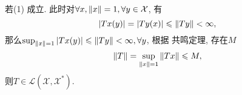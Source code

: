 \documentclass[12pt,a4paper,oneside]{ctexart}
\newcommand{\sX}{\mathcal{X}}
\newcommand{\sL}{\mathcal{L}}
\begin{document}
    若(1) 成立. 此时对$\forall x,\norm{x}=1,\forall y\in \sX$, 有 
    \begin{equation*}
        \abs{Tx(y)}=\abs{Ty(x)}\leqslant \norm{Ty}<\infty,
    \end{equation*}
    那么$\sup_{\norm{x}=1}\abs{Tx(y)}\leqslant \norm{Ty}<\infty,\forall y$, 根据
    共鸣定理, 存在$M$
    \begin{equation*}
        \norm{T}=\sup_{\norm{x}=1}\norm{Tx}\leqslant M,
    \end{equation*}
    则$T\in\sL(\sX,\sX^\ast)$.
\end{document}
